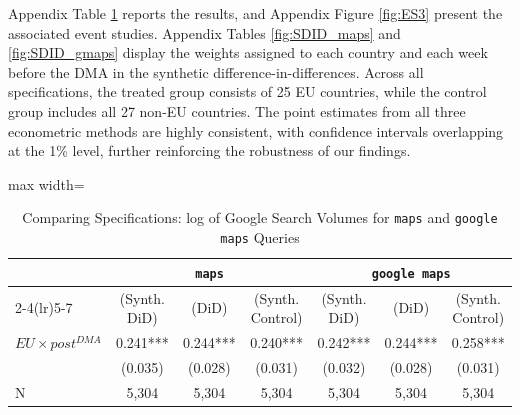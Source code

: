 \documentclass[11pt]{article}
\begin{document}
	Appendix Table \ref{tab:sdid} reports the results, and  Appendix Figure \ref{fig:ES3} present the associated event studies. Appendix Tables \ref{fig:SDID_maps} and \ref{fig:SDID_gmaps} display the weights assigned to each country and each week before the DMA in the synthetic difference-in-differences. Across all specifications, the treated group consists of 25 EU countries, while the control group includes all 27 non-EU countries. The point estimates from all three econometric methods are highly consistent, with confidence intervals overlapping at the 1\% level, further reinforcing the robustness of our findings.
	
	\clearpage
	
	\begin{table}[ht!]
		\centering
		\def\sym#1{\ifmmode^{#1}\else\(^{#1}\)\fi}
		\caption{\label{tab:sdid} Comparing Specifications: log of Google Search Volumes for \texttt{maps} and \texttt{google maps} Queries}
		\begin{threeparttable}
			\begin{adjustbox}{max width=\linewidth}
				\begin{tabular}{lcccccc}
					\hline \noalign{\smallskip} 
					& \multicolumn{3}{c}{\texttt{maps}} & \multicolumn{3}{c}{\texttt{google maps}}  \\ \cmidrule(lr){2-4}\cmidrule(lr){5-7}
					
					&(Synth. DiD)   &       (DiD)   &(Synth. Control)   &(Synth. DiD)   &       (DiD)   &(Synth. Control)   \\
					\midrule
					$ EU \times post^{DMA} $ &       0.241***&       0.244***&       0.240***&       0.242***&       0.244***&       0.258***\\
					&     (0.035)   &     (0.028)   &     (0.031)   &     (0.032)   &     (0.028)   &     (0.031)   \\
					
					N                   &       5,304   &       5,304   &       5,304   &       5,304   &       5,304   &       5,304   \\
					
					\midrule
					

\end{tabular}
\end{adjustbox}
\end{threeparttable}
\end{table}
\end{document}

